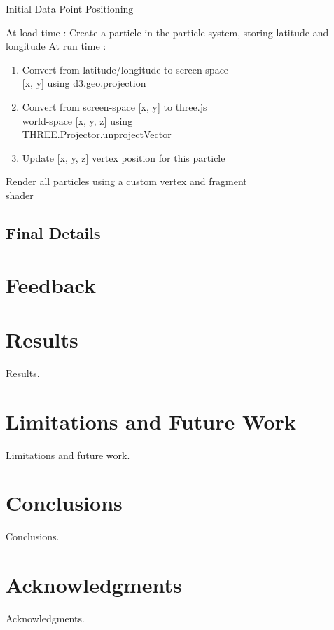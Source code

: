 \documentclass[conference]{acmsiggraph}
\begin{document}
\begin{algorithm}
\DontPrintSemicolon
\caption{Initial Data Point Positioning}
    At load time :  {
        Create a particle in the particle system, storing latitude and longitude
    }
    At run time :  {
         {
            \begin{enumerate}
                \item Convert from latitude/longitude to screen-space \\
                    {[}x, y{]} using d3.geo.projection
                \item Convert from screen-space {[}x, y{]} to three.js \\
                    world-space {[}x, y, z{]} using \\
                    THREE.Projector.unprojectVector
                \item Update {[}x, y, z{]} vertex position for this particle
            \end{enumerate}
        }
        Render all particles using a custom vertex and fragment \\ shader
    }
\end{algorithm}

\subsection{Final Details}


\section{Feedback}

\section{Results}

Results.


\section{Limitations and Future Work}

Limitations and future work.


\section{Conclusions}

Conclusions.

\section{Acknowledgments}

Acknowledgments.



\end{document}
